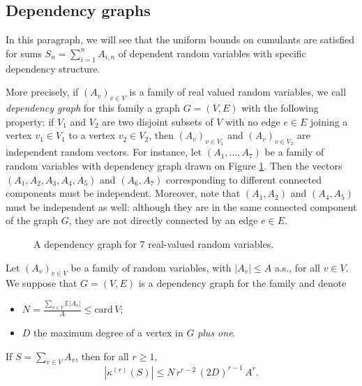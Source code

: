 \documentclass[envcountsame]{svmult}
\newcommand{\esper}{\mathbb{E}}
\newcommand{\card}{\mathrm{card}}
\begin{document}
\subsection{Dependency graphs}
\label{subsec:dependency}
In this paragraph, we will see that the uniform bounds on cumulants are satisfied 
for sums $S_n = \sum_{i=1}^n A_{i,n}$ of dependent random variables
with specific dependency structure.\medskip


More precisely, if $(A_v)_{v \in V}$ is a family of real valued random variables, we call \emph{dependency graph} for this family a graph $G=(V,E)$ with the following property:
if $V_1$ and $V_2$ are two disjoint subsets of $V$ with no edge $e \in E$ joining a vertex $v_1 \in V_1$ to a vertex $v_2 \in V_2$, then $(A_v)_{v \in V_1}$ and $(A_v)_{v \in V_2}$ are independent random vectors. For instance, let $(A_1,\ldots,A_7)$ be a family of random variables with  dependency graph drawn on Figure \ref{fig:dependency}.
Then the vectors $(A_1,A_2,A_3,A_4,A_5)$ and $(A_6,A_7)$ corresponding to different connected components must be independent.
Moreover, note that
 $(A_1,A_2)$ and $(A_4,A_5)$ must be independent as well:
 although they are in the same connected component of the graph $G$,
 they are not directly connected by an edge $e \in E$.
\begin{figure}[ht]
\begin{center}
\end{center}

\caption{A dependency graph for $7$ real-valued random variables.\label{fig:dependency}}
\end{figure}

\begin{theorem}\label{thm:boundcumulant}
Let $(A_v)_{v \in V}$ be a family of random variables, with $|A_v| \leq A$ a.s., for all $v \in V$. 
We suppose that $G=(V,E)$ is a dependency graph for the family and denote
\begin{itemize}
  \item $N=\tfrac{\sum_{v\in V} \esper|A_v|}{A} \le \card\, V$;
  \item $D$ the maximum degree of a vertex in $G$ \emph{plus one}.
\end{itemize}
    If $S=\sum_{v \in V} A_v$, 
then for all $r \geq 1$,
$$ |\kappa^{(r)}(S)| \leq N\,r^{r-2}\,(2D)^{r-1}\,A^r.$$
\end{theorem}
\end{document}
